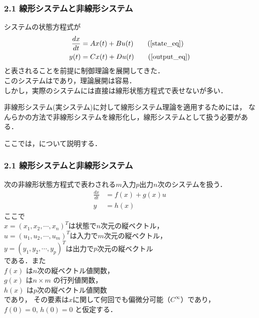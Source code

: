 
\begin{frame}[t]
\frametitle{2.1 線形システムと非線形システム}
システムの状態方程式が
\begin{align}
 \frac{dx}{dt} &= A x(t) + B u(t) \tag{\ref{state_eq}} \\
 y(t) &= C x(t) + D u(t) \tag{\ref{output_eq}}
\end{align}
と表されることを前提に制御理論を展開してきた．\\
このシステムはであり，理論展開は容易．\\
しかし，実際のシステムには直接は線形状態方程式で表せないが多い．

非線形システム(実システム)に対して線形システム理論を適用するためには，
なんらかの方法で非線形システムを線形化し，線形システムとして扱う必要があ
る．

ここでは，について説明する．
\end{frame}

\begin{frame}[t]
\frametitle{2.1 線形システムと非線形システム}
次の非線形状態方程式で表わされる$m$入力$p$出力$n$次のシステムを扱う．
\begin{align}
 \frac{dx}{dt} &= f(x) + g(x) u \label{orsys_state} \\
 y             &= h(x) \label{orsys_output}
\end{align}
ここで\\
\hspace*{1cm}
$x=(x_1, x_2, \cdots, x_n)^T$は状態で$n$次元の縦ベクトル，\\
\hspace*{1cm}
$u=(u_1, u_2, \cdots, u_m)^T$は入力で$m$次元の縦ベクトル，\\
\hspace*{1cm}
$y=(y_1, y_2, \cdots, y_p)^T$は出力で$p$次元の縦ベクトル\\
である．また\\
\hspace*{1cm}
$f(x)$ は$n$次の縦ベクトル値関数，\\
\hspace*{1cm}
$g(x)$ は$n \times m$ の行列値関数，\\
\hspace*{1cm}
$h(x)$ は$p$次の縦ベクトル値関数\\
であり，
その要素は$x$に関して何回でも偏微分可能（$C^\infty$）であり，\\
$f(0) = 0$, $h(0)= 0$
と仮定する．

\end{frame}

